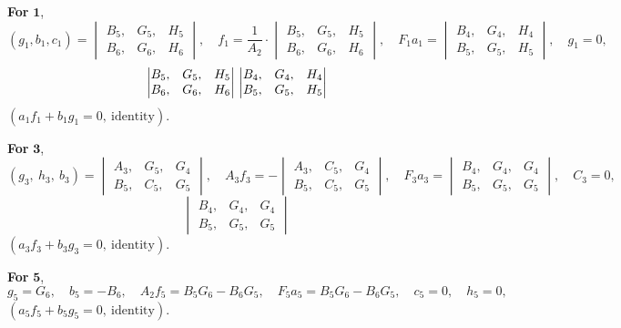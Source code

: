 \documentclass[11pt,a4paper]{article}
\begin{document}
\textbf{For} $\mathbf{1}$,
\[
(g_{1}, b_{1}, c_{1}) = \begin{vmatrix} B_{5}, & G_{5}, & H_{5}\\ B_{6}, & G_{6}, & H_{6}\end{vmatrix},\quad f_{1} = \frac{1}{A_{2}}\!\cdot\!\begin{vmatrix} B_{5}, & G_{5}, & H_{5}\\ B_{6}, & G_{6}, & H_{6}\end{vmatrix},\quad F_{1}a_{1} = \begin{vmatrix} B_{4}, & G_{4}, & H_{4}\\ B_{5}, & G_{5}, & H_{5}\end{vmatrix},\quad g_{1} = 0,
\]
\[
\begin{vmatrix} B_{5}, & G_{5}, & H_{5}\\ B_{6}, & G_{6}, & H_{6}\end{vmatrix}\\
\begin{vmatrix} B_{4}, & G_{4}, & H_{4}\\ B_{5}, & G_{5}, & H_{5}\end{vmatrix}
\]
$(a_{1}f_{1} + b_{1}g_{1} = 0,\ \text{identity})$.

\textbf{For} $\mathbf{3}$,
\[
(g_{3},\ h_{3},\ b_{3}) = \begin{vmatrix} A_{3}, & G_{5}, & G_{4}\\ B_{5}, & C_{5}, & G_{5}\end{vmatrix},\quad A_{3}f_{3} = -\begin{vmatrix} A_{3}, & C_{5}, & G_{4}\\ B_{5}, & C_{5}, & G_{5}\end{vmatrix},\quad F_{3}a_{3} = \begin{vmatrix} B_{4}, & G_{4}, & G_{4}\\ B_{5}, & G_{5}, & G_{5}\end{vmatrix},\quad C_{3} = 0,
\]
\[
\begin{vmatrix} B_{4}, & G_{4}, & G_{4}\\ B_{5}, & G_{5}, & G_{5}\end{vmatrix}
\]
$(a_{3}f_{3} + b_{3}g_{3} = 0,\ \text{identity})$.

\newpage
\setcounter{page}{322}

\textbf{For} $\mathbf{5}$,
\[
g_{5} = G_{6},\quad b_{5} = -B_{6},\quad A_{2}f_{5} = B_{5}G_{6} - B_{6}G_{5},\quad F_{5}a_{5} = B_{5}G_{6} - B_{6}G_{5},\quad c_{5} = 0,\quad h_{5} = 0,
\]
$(a_{5}f_{5} + b_{5}g_{5} = 0,\ \text{identity})$.
\end{document}
